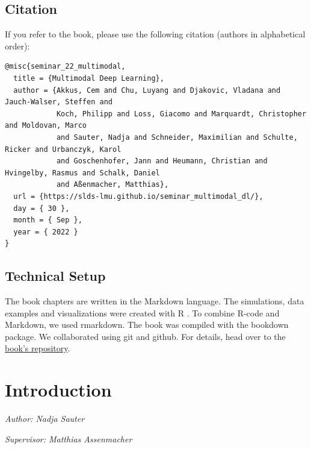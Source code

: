 \documentclass[
]{krantz}
\begin{document}
\hypertarget{citation}{%
\section{Citation}\label{citation}}

If you refer to the book, please use the following citation (authors in alphabetical order):

\begin{verbatim}
@misc{seminar_22_multimodal,
  title = {Multimodal Deep Learning},
  author = {Akkus, Cem and Chu, Luyang and Djakovic, Vladana and Jauch-Walser, Steffen and
            Koch, Philipp and Loss, Giacomo and Marquardt, Christopher and Moldovan, Marco
            and Sauter, Nadja and Schneider, Maximilian and Schulte, Ricker and Urbanczyk, Karol
            and Goschenhofer, Jann and Heumann, Christian and Hvingelby, Rasmus and Schalk, Daniel
            and Aßenmacher, Matthias},
  url = {https://slds-lmu.github.io/seminar_multimodal_dl/},
  day = { 30 },
  month = { Sep },
  year = { 2022 }
}
\end{verbatim}

\hypertarget{technical-setup}{%
\section*{Technical Setup}\label{technical-setup}}


The book chapters are written in the Markdown language.
The simulations, data examples and visualizations were created with R \citep{rlang}.
To combine R-code and Markdown, we used rmarkdown.
The book was compiled with the bookdown package.
We collaborated using git and github.
For details, head over to the \href{https://github.com/slds-lmu/seminar_multimodal_dl}{book's repository}.

\hypertarget{introduction}{%
\chapter{Introduction}\label{introduction}}

\emph{Author: Nadja Sauter}

\emph{Supervisor: Matthias Assenmacher}
\end{document}
